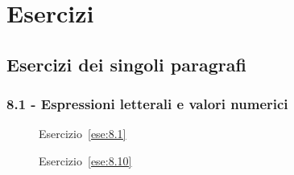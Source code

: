 \section{Esercizi}
\subsection{Esercizi dei singoli paragrafi}
\subsubsection*{8.1 - Espressioni letterali e valori numerici}
\begin{figure}[b]
\begin{minipage}[t]{.45\textwidth}
 \centering
 \caption{Esercizio~\ref{ese:8.1}}\label{fig:8.1}
\end{minipage}
 \begin{minipage}[t]{.45\textwidth}
 \centering 
 \caption{Esercizio~\ref{ese:8.10}}\label{fig:8.2}
\end{minipage}
\end{figure}

